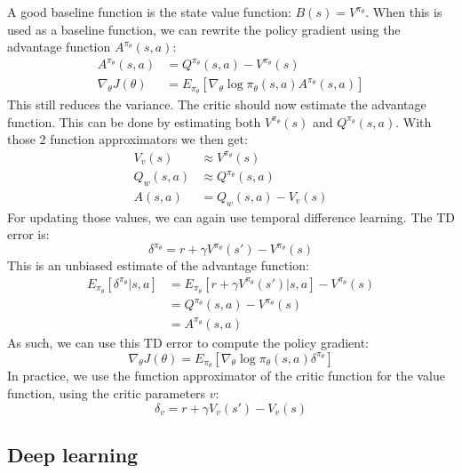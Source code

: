 \documentclass[a4paper]{article}
\begin{document}
A good baseline function is the state value function: $B(s) = V^{\pi_{\theta}}$. When this is used as a baseline function, we can rewrite the policy gradient using the advantage function $A^{\pi_{\theta}}(s,a)$:
\begin{align}
A^{\pi_{\theta}}(s,a) &= Q^{\pi_{\theta}}(s,a) - V^{\pi_{\theta}}(s)\\
\nabla_{\theta}J(\theta) &= E_{\pi_{\theta}}[\nabla_{\theta} \log \pi_{\theta}(s,a) A^{\pi_{\theta}}(s,a)]
\end{align}
This still reduces the variance. The critic should now estimate the advantage function. This can be done by estimating both $V^{\pi_{\theta}}(s)$ and $Q^{\pi_{\theta}}(s,a)$. With those 2 function approximators we then get:
\begin{align}
V_v(s) &\approx V^{\pi_{\theta}}(s)\\
Q_w(s,a) &\approx Q^{\pi_{\theta}}(s,a)\\
A(s,a) &= Q_w(s,a) - V_v(s)
\end{align}
For updating those values, we can again use temporal difference learning. The TD error is:
\begin{equation}
\delta^{\pi_{\theta}} = r + \gamma V^{\pi_{\theta}}(s') - V^{\pi_{\theta}}(s)
\end{equation}
This is an unbiased estimate of the advantage function:
\begin{align}
E_{\pi_{\theta}}[\delta^{\pi_{\theta}} | s,a] &= E_{\pi_{\theta}}[r + \gamma V^{\pi_{\theta}}(s') | s,a] - V^{\pi_{\theta}}(s)\\
&= Q^{\pi_{\theta}}(s,a) - V^{\pi_{\theta}}(s)\\
&= A^{\pi_{\theta}}(s,a)
\end{align}
As such, we can use this TD error to compute the policy gradient:
\begin{equation}
\nabla_{\theta}J(\theta) = E_{\pi_{\theta}}[\nabla_{\theta} \log \pi_{\theta}(s,a) \delta^{\pi_{\theta}}]
\end{equation}
In practice, we use the function approximator of the critic function for the value function, using the critic parameters $v$:
\begin{equation}
\delta_v = r + \gamma V_v(s') - V_v(s)
\end{equation}

\subsection{Deep learning}
\end{document}
